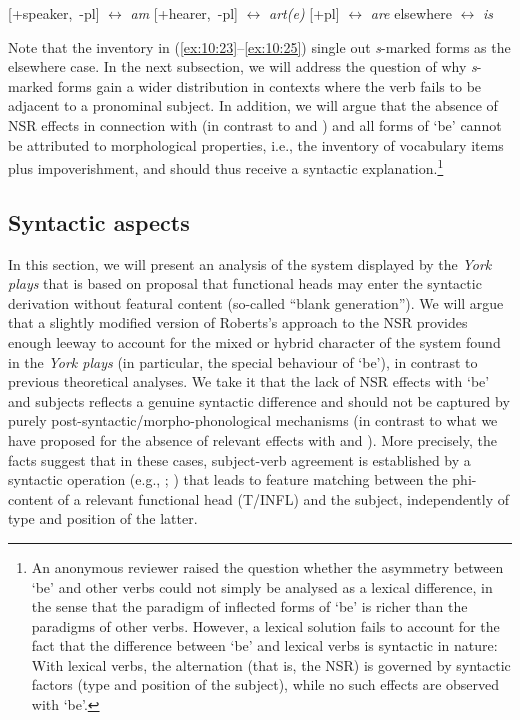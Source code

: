 \documentclass[output=paper]{langsci/langscibook}
\begin{document}
\ea\label{ex:10:25}
\ea \mbox{[+speaker, -pl]} $\leftrightarrow$ \emph{am}
\ex \mbox{[+hearer, -pl]} $\leftrightarrow$ \emph{art(e)}
\ex \mbox{[+pl]} $\leftrightarrow$ \emph{are}
\ex elsewhere $\leftrightarrow$ \emph{is}
\z
\z

Note that the inventory in (\ref{ex:10:23}--\ref{ex:10:25}) single out \emph{s}-marked forms as the
elsewhere case. In the next subsection, we will address the question of why
\emph{s}-marked forms gain a wider distribution in contexts where the verb
fails to be adjacent to a pronominal subject. In addition, we will argue that
the absence of \gls{NSR} effects in connection with \Fsg{} (in contrast to
\Ssg{} and \Tsg{}) and all forms of `be' cannot be attributed to morphological
properties, i.e., the inventory of vocabulary items plus impoverishment, and
should thus receive a syntactic explanation.\footnote{An anonymous reviewer
    raised the question whether the asymmetry between `be' and other verbs
    could not simply be analysed as a lexical difference, in the sense that the
    paradigm of inflected forms of `be' is richer than the paradigms of other
    verbs.  However, a lexical solution fails to account for the fact that the
    difference between `be' and lexical verbs is syntactic in nature: With
    lexical verbs, the  alternation (that is, the
\gls{NSR}) is governed by syntactic factors (type and
position of the subject), while no such effects are observed with `be'.}

\subsection{Syntactic aspects}\label{sub:10.4.2}

In this section, we will present an analysis of the  system
displayed by the \emph{York plays} that is based on 
proposal that functional heads may enter the syntactic derivation without
featural content (so-called ``blank generation''). We will argue that a
slightly modified version of Roberts's approach to the \gls{NSR} provides enough leeway to account for the mixed or hybrid
    character of the  system found in the \emph{York plays} (in
    particular, the special behaviour of `be'), in contrast to previous
    theoretical analyses. We take it that the lack of \gls{NSR} effects with `be' and \Fsg{} subjects reflects a genuine
    syntactic difference and should not be captured by purely
    post-syntactic/morpho-phonological mechanisms (in contrast to what we have
    proposed for the absence of relevant effects with \Ssg{} and \Tsg{}). More
    precisely, the facts suggest that in these cases, subject-verb agreement is
    established by a syntactic operation (e.g., ;
    \citealt{Chomsky2000}) that leads to feature matching between the
    phi-content of a relevant functional head (T/INFL) and
    the subject, independently of type and position of the latter.
\end{document}
